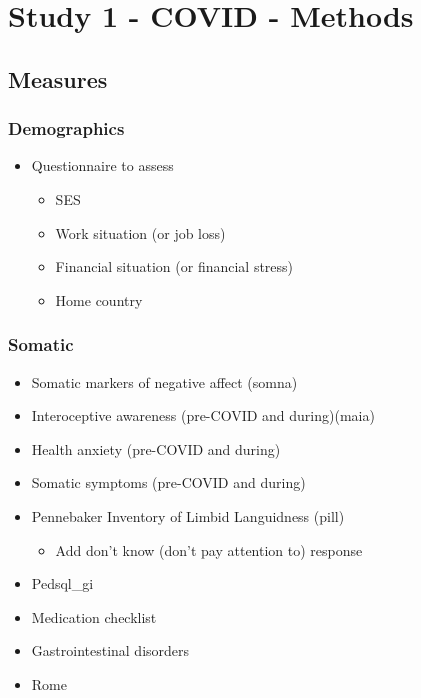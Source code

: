 \documentclass[]{book}
\providecommand{\tightlist}{%
  \setlength{\itemsep}{0pt}\setlength{\parskip}{0pt}}
\begin{document}
\hypertarget{study-1---covid---methods}{%
\chapter{Study 1 - COVID - Methods}\label{study-1---covid---methods}}

\hypertarget{measures}{%
\section{Measures}\label{measures}}

\hypertarget{demographics}{%
\subsection{Demographics}\label{demographics}}

\begin{itemize}
\tightlist
\item
  Questionnaire to assess

  \begin{itemize}
  \tightlist
  \item
    SES
  \item
    Work situation (or job loss)
  \item
    Financial situation (or financial stress)
  \item
    Home country
  \end{itemize}
\end{itemize}

\hypertarget{somatic}{%
\subsection{Somatic}\label{somatic}}

\begin{itemize}
\tightlist
\item
  Somatic markers of negative affect (somna)
\item
  Interoceptive awareness (pre-COVID and during)(maia)
\item
  Health anxiety (pre-COVID and during)
\item
  Somatic symptoms (pre-COVID and during)
\item
  Pennebaker Inventory of Limbid Languidness (pill)

  \begin{itemize}
  \tightlist
  \item
    Add don't know (don't pay attention to) response
  \end{itemize}
\item
  Pedsql\_gi
\item
  Medication checklist
\item
  Gastrointestinal disorders
\item
  Rome
\end{itemize}
\end{document}

